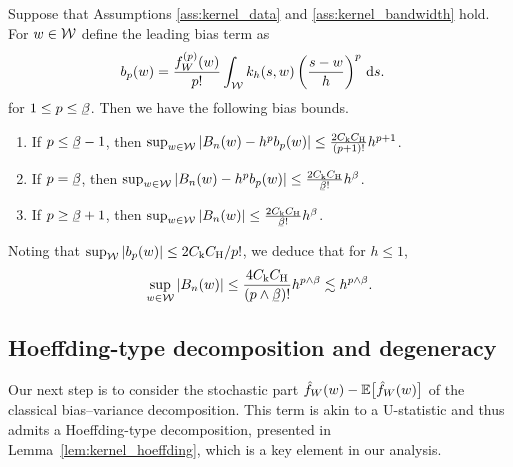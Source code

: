 \begin{theorem}
  \label{thm:kernel_bias}

  Suppose that Assumptions \ref{ass:kernel_data} and \ref{ass:kernel_bandwidth}
  hold. For $w \in \mathcal{W}$ define the leading bias term as
  \begin{align*}
    b_p(w)
    &=
    \frac{f_W^{(p)}(w)}{p!}
    \int_{\mathcal{W}}
    k_h(s,w)
    \left(
      \frac{s-w}{h}
    \right)^p
    \,\mathrm{d}s.
  \end{align*}
  for $1 \leq p \leq \flbeta$. Then we have the following bias bounds.
  \begin{enumerate}[label=(\roman*)]
    \item If $p \leq \flbeta - 1$, then
      $\sup_{w \in \mathcal{W}} | B_n(w) - h^p b_p(w) |
      \leq \frac{2 C_{\mathrm{k}} C_{\mathrm{H}}}{(p+1)!} h^{p+1}$.

    \item If $p = \flbeta$, then
      $\sup_{w \in \cW} | B_n(w) - h^p b_p(w) |
      \leq \frac{2 C_\rk C_\rH}{\flbeta !} h^\beta$.

    \item If $p \geq \flbeta+1$, then
      $\sup_{w \in \cW} | B_n(w) |
      \leq \frac{2 C_\rk C_\rH}{\flbeta !} h^\beta$.
  \end{enumerate}
  Noting that $\sup_{\mathcal{W}} |b_p(w)| \leq 2 C_{\mathrm{k}} C_{\mathrm{H}} / p!$,
  we deduce that for $h \leq 1$,
  \begin{align*}
    \sup_{w \in \cW} | B_n(w) |
    \leq
    \frac{4 C_\rk C_\rH}{(p \wedge \flbeta)!}
    h^{p \wedge \beta}
    \lesssim
    h^{p \wedge \beta}.
  \end{align*}

\end{theorem}

\subsection{Hoeffding-type decomposition and degeneracy}
\label{sec:kernel_degeneracy}

Our next step is to consider the stochastic part
$\hat f_W(w) - \mathbb{E} \big[ \hat f_W(w) \big]$
of the classical bias--variance decomposition. This term is akin to a
U-statistic and thus admits a Hoeffding-type decomposition, presented in
Lemma~\ref{lem:kernel_hoeffding}, which is a key element in our analysis.

